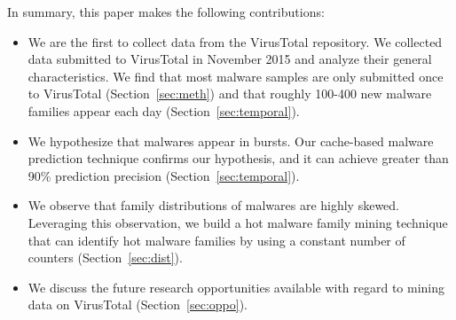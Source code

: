 In summary, this paper makes the following contributions:

\begin{itemize}

\item We are the first to collect data from the VirusTotal repository.
We collected data submitted to VirusTotal in November 2015 
and analyze their general characteristics. 
We find that most malware samples are only submitted once to VirusTotal (Section~\ref{sec:meth}) 
and that roughly 100-400 new malware families appear each day (Section~\ref{sec:temporal}). 


\item We hypothesize that malwares appear in bursts. 
Our cache-based malware prediction technique confirms our hypothesis, 
and it can achieve greater than 90\% prediction precision (Section~\ref{sec:temporal}). 

\item We observe that family distributions of malwares are highly skewed. 
Leveraging this observation, we build a hot malware family mining technique that can identify hot 
malware families by using a constant number of counters (Section~\ref{sec:dist}).

\item We discuss the future research opportunities available with regard to mining data on VirusTotal (Section~\ref{sec:oppo}). 

\end{itemize}


